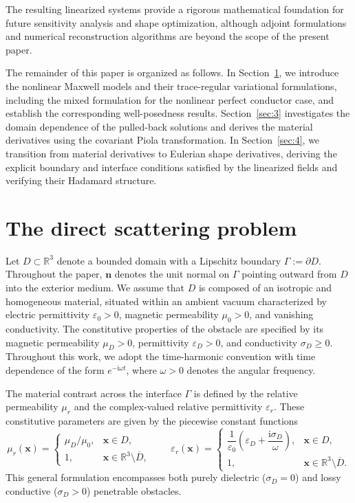 \documentclass[12pt,reqno]{amsart}
\theoremstyle{definition}
\numberwithin{equation}{section}
\begin{document}
The resulting linearized systems provide a rigorous mathematical foundation for future sensitivity analysis and shape optimization, although adjoint formulations and numerical reconstruction algorithms are beyond the scope of the present paper.

The remainder of this paper is organized as follows. In Section~\ref{sec:2}, we introduce the nonlinear Maxwell models and their trace-regular variational formulations, including the mixed formulation for the nonlinear perfect conductor case, and establish the corresponding well-posedness results. Section~\ref{sec:3} investigates the domain dependence of the pulled-back solutions and derives the material derivatives using the covariant Piola transformation. In Section~\ref{sec:4}, we transition from material derivatives to Eulerian shape derivatives, deriving the explicit boundary and interface conditions satisfied by the linearized fields and verifying their Hadamard structure.




\section{The direct scattering problem} \label{sec:2}

Let \(D\subset\mathbb R^3\) denote a bounded domain with a Lipschitz boundary
\(\Gamma:=\partial D\). Throughout the paper, \(\mathbf n\) denotes the unit
normal on \(\Gamma\) pointing outward from \(D\) into the exterior medium. We assume that $D$ is composed of an isotropic and homogeneous material, situated within an ambient vacuum characterized by electric permittivity $\varepsilon_0 > 0$, magnetic permeability $\mu_0 > 0$, and vanishing conductivity. The constitutive properties of the obstacle are specified by its magnetic permeability $\mu_D > 0$, permittivity $\varepsilon_D > 0$, and conductivity $\sigma_D \geq 0$. Throughout this work, we adopt the time-harmonic convention with time dependence of the form $e^{-\mathrm{i}\omega t}$, where $\omega > 0$ denotes the angular frequency.

The material contrast across the interface $\Gamma$ is defined by the relative permeability $\mu_r$ and the complex-valued relative permittivity $\varepsilon_r$. These constitutive parameters are given by the piecewise constant functions
\[
    \mu_r(\boldsymbol{x}) =
    \begin{cases}
        \mu_D/\mu_0, & \boldsymbol{x} \in D, \\
        1, & \boldsymbol{x} \in \mathbb{R}^3 \setminus \overline{D},
    \end{cases}
    \qquad
    \varepsilon_r(\boldsymbol{x}) =
    \begin{cases}
        \dfrac{1}{\varepsilon_0}
        \left( \varepsilon_D + \dfrac{\mathrm{i}\sigma_D}{\omega} \right),
        & \boldsymbol{x} \in D, \\
        1, & \boldsymbol{x} \in \mathbb{R}^3 \setminus \overline{D}.
    \end{cases}
\]
This general formulation encompasses both purely dielectric ($\sigma_D = 0$) and lossy conductive ($\sigma_D > 0$) penetrable obstacles. 
\end{document}
